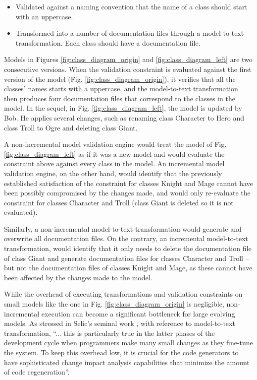 \begin{itemize}
  \item Validated against a naming convention that the name of a class should start with an uppercase.
  \item Transformed into a number of documentation files through a model-to-text transformation. Each class should have a documentation file.
\end{itemize}

Models in Figures \ref{fig:class_diagram_origin} and \ref{fig:class_diagram_left} are two consecutive versions. When the validation constraint is evaluated against the first version of the model (Fig. \ref{fig:class_diagram_origin}), it verifies that all the classes' names starts with a uppercase, and the model-to-text transformation then produces four documentation files that correspond to the classes in the model. In the sequel, in Fig. \ref{fig:class_diagram_left}, the model is updated by Bob. He applies several changes, such as renaming class \textsf{Character} to \textsf{Hero} and class \textsf{Troll} to \textsf{Ogre} and deleting class \textsf{Giant}.

A non-incremental model validation engine would treat the model of 
Fig. \ref{fig:class_diagram_left} as if it was a new model and would evaluate 
the constraint above against every class in the model. 
An incremental model validation engine, on the other hand, would identify 
that the previously established satisfaction of the constraint for classes 
\textsf{Knight} and \textsf{Mage} cannot have been possibly compromised by the changes made, and would only re-evaluate the constraint for classes \textsf{Character} and \textsf{Troll} (class \textsf{Giant} is deleted so it is not evaluated). 

Similarly, a non-incremental model-to-text transformation would generate 
and overwrite all documentation files. On the contrary, an 
incremental model-to-text transformation, would identify that it only needs to delete the documentation file of class \textsf{Giant} and generate documentation files for classes \textsf{Character} and \textsf{Troll} -- but not the documentation files of classes \textsf{Knight} and \textsf{Mage}, as these cannot have been affected by the changes made to the model.

While the overhead of executing transformations and validation constraints 
on small models like the one in Fig. \ref{fig:class_diagram_origin} is negligible, non-incremental execution can become a significant bottleneck for large evolving models. As stressed in Selic's seminal work \cite{selic2003pragmatics}, with reference to model-to-text transformation, ``... \textsf{this is particularly true in the latter phases of the development cycle when programmers make many small changes as they fine-tune the system. To keep this overhead low, it is crucial for the code generators to have sophisticated change impact analysis capabilities that minimize the amount of code regeneration}''.

